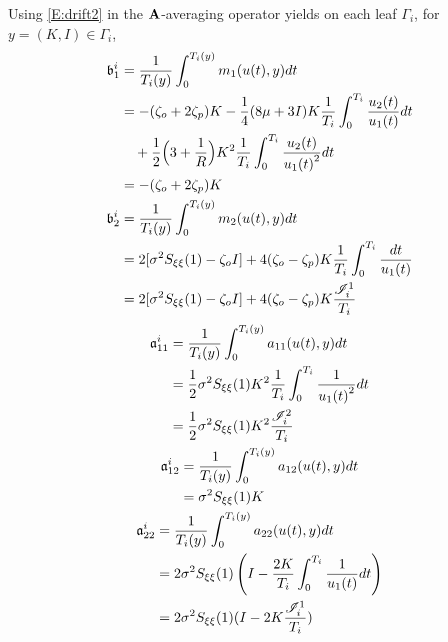 Using \eqref{E:drift2} in the $\operatorname{\mathbf A}$-averaging operator yields on each leaf $\Gamma_i$, for $y=(K,I) \in \Gamma_i$,
\begin{gather}
\begin{split}
\mathfrak b_1^i &= \frac{1}{T_i(y)}\int_{0}^{T_i(y)} m_1(u(t),y) dt\\
&= -(\zeta_o+2\zeta_p) K -\frac14 (8\mu + 3I) K \frac{1}{T_i} \int_0^{T_i} \frac{u_2(t)}{u_1(t)} dt\\
&\quad + \frac12 \Bigl(3 + \frac{1}{R} \Bigr) K^2
\frac{1}{T_i} \int_{0}^{T_i}
\frac{u_2(t)}{{u_1(t)}^2} dt\\
&= -(\zeta_o + 2\zeta_p) K
\end{split}
\label{E:drift h}\\
\begin{split}
\mathfrak b_2^i & = \frac{1}{T_i(y)}\int_{0}^{T_i(y)} m_2(u(t),y) dt\\
& = 2 [\sigma^2 S_{\xi\xi}(1) - \zeta_o I] + 4(\zeta_o-\zeta_p) K
\frac{1}{T_i}\int_{0}^{T_i}\frac{dt}{u_1(t)}\\
& = 2 [\sigma^2 S_{\xi\xi}(1) - \zeta_o I] + 4(\zeta_o-\zeta_p) K \frac{\mathscr I_{i}^1}{T_i}
\end{split}
\end{gather}
\begin{gather}
\begin{split}
\mathfrak a_{11}^i &= \frac{1}{T_i(y)}\int_{0}^{T_i(y)} a_{11}(u(t),y) dt\\
&= \frac12 \sigma^2 S_{\xi\xi}(1) K^2 \frac{1}{T_i}\int_0^{T_i}
\frac{1}{{u_1(t)}^2}dt\\
&= \frac12 \sigma^2 S_{\xi\xi}(1){K}^2 \frac{\mathscr I_{i}^2}{T_i}
\end{split}\\
\begin{split}
\mathfrak a_{12}^{i} &= \frac{1}{T_i(y)}\int_{0}^{T_i(y)} a_{12}(u(t),y)dt\\
&= \sigma^2 S_{\xi\xi}(1) K
\label{E:diffusion hi}
\end{split}
\\
\begin{split}
\mathfrak a_{22}^i &= \frac{1}{T_i(y)} \int_0^{T_i(y)} a_{22}(u(t),y)dt\\
&= 2 \sigma^2 S_{\xi\xi}(1) \left(I - \frac{2 K}{T_i} \int_0^{T_i} \frac{1}{u_1(t)}dt \right)\\
&= 2 \sigma^2 S_{\xi\xi}(1) (I - 2 K \frac{\mathscr I_i^1}{T_i})
\end{split}
\end{gather}
